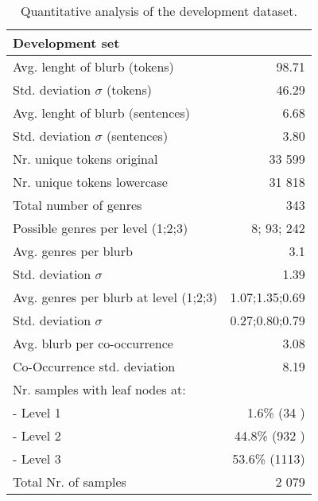 \documentclass[11pt,a4paper]{article}
\begin{document}
\begin{table}
\small
\begin{center}
\begin{tabular}{|l|r|}
\hline\centering\textbf{Development set}  &             \\
\hline
Avg. lenght of blurb (tokens)              &   98.71        \\
Std. deviation $\sigma$ (tokens)           &   46.29        \\
Avg. lenght of blurb (sentences)           &   6.68         \\
Std. deviation $\sigma$ (sentences)        &   3.80         \\
\hline
Nr. unique tokens original                 &  33 599        \\
Nr. unique tokens lowercase                &  31 818        \\
\hline
Total number of genres                     &   343             \\
Possible genres per level (1;2;3)          &   8; 93; 242      \\
Avg. genres per blurb                      &   3.1             \\
Std. deviation $\sigma$                    &   1.39            \\
Avg. genres per blurb at level (1;2;3)     &   1.07;1.35;0.69  \\
Std. deviation $\sigma$                    &   0.27;0.80;0.79  \\
\hline
Avg. blurb per co-occurrence               &   3.08            \\
Co-Occurrence std. deviation               &   8.19            \\
\hline
Nr. samples with leaf nodes at:            &                   \\
 - Level 1                                 &  1.6\% (34 )      \\
 - Level 2                                 &  44.8\% (932 )    \\
 - Level 3                                 &  53.6\% (1113)    \\
\hline
Total Nr. of samples                       &  2 079            \\
\hline
\end{tabular}
\end{center}
\caption{\label{quantitivy-analysis-dev}Quantitative analysis of the development dataset.}
\end{table}
\end{document}
